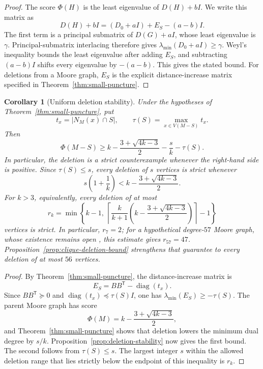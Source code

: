\documentclass[a4paper,10pt,reqno]{amsart}
\theoremstyle{plain}
\newtheorem{corollary}[theorem]{Corollary}
\theoremstyle{definition}
\theoremstyle{remark}
\newcommand{\resultbox}[1]{\boxed{#1}}
\begin{document}
\begin{proof}
The score \(\Phi(H)\) is the least eigenvalue of \(D(H)+bI\).
We write this matrix as
\[
 D(H)+bI=(D_0+aI)+E_S-(a-b)I.
\]
The first term is a principal submatrix of \(D(G)+aI\), whose least
eigenvalue is \(\gamma\).  Principal-submatrix interlacing
\cite[Corollary~2.2]{Haemers1995} therefore gives
\(\lambda_{\min}(D_0+aI)\ge\gamma\).
Weyl's inequality bounds the least eigenvalue after adding \(E_S\),
and subtracting \((a-b)I\) shifts every eigenvalue by \(-(a-b)\).
This gives the stated bound.  For deletions from a Moore graph, \(E_S\) is the
explicit distance-increase matrix specified in Theorem~\ref{thm:small-puncture}.
\end{proof}

\begin{corollary}[Uniform deletion stability]
\label{cor:uniform-deletion}
Under the hypotheses of Theorem~\ref{thm:small-puncture}, put
\[
 t_x=|N_M(x)\cap S|,
 \qquad
 \tau(S)=\max_{x\in V(M-S)}t_x.
\]
Then
\[
 \resultbox{
 \Phi(M-S)\ge
 k-\frac{3+\sqrt{4k-3}}2-\frac{s}{k}-\tau(S).
 }
\]
In particular, the deletion is a strict counterexample whenever the
right-hand side is positive.  Since \(\tau(S)\le s\), every deletion of
\(s\) vertices is strict whenever
\[
 \resultbox{
 s\left(1+\frac1k\right)
 <k-\frac{3+\sqrt{4k-3}}2.
 }
\]
For \(k>3\), equivalently, every deletion of at most
\[
 r_k=\min\left\{
 k-1,\
 \left\lceil
 \frac{k}{k+1}\left(k-\frac{3+\sqrt{4k-3}}2\right)
 \right\rceil-1
 \right\}
\]
vertices is strict.  In particular, \(r_7=2\); for a hypothetical
degree-\(57\) Moore graph, whose existence remains open
\cite{SmithMontemanni2026}, this estimate gives \(r_{57}=47\).
Proposition~\ref{prop:clique-deletion-bound} strengthens that
guarantee to every deletion of at most \(56\) vertices.
\end{corollary}

\begin{proof}
By Theorem~\ref{thm:small-puncture}, the distance-increase matrix is
\[
 E_S=BB^{\mathsf T}-\operatorname{diag}(t_x).
\]
Since \(BB^{\mathsf T}\succeq0\) and
\(\operatorname{diag}(t_x)\preceq\tau(S)I\), one has
\(\lambda_{\min}(E_S)\ge-\tau(S)\).  The parent Moore graph has score
\[
 \Phi(M)=k-\frac{3+\sqrt{4k-3}}2,
\]
and Theorem~\ref{thm:small-puncture} shows that deletion lowers the minimum
dual degree by \(s/k\).  Proposition~\ref{prop:deletion-stability} now gives
the first bound. The second follows from \(\tau(S)\le s\). The largest integer \(s\) within the allowed deletion range that lies
strictly below the endpoint of this inequality is
\(r_k\).
\end{proof}
\end{document}

